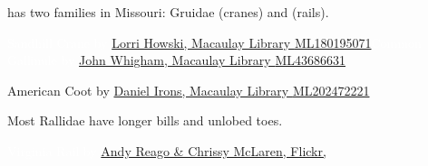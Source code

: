 \documentclass[t]{beamer}
\begin{document}
{
\begin{frame}[t]{ has two families in Missouri: Gruidae (cranes) and  (rails).}



\vfilll

\tiny \textcolor{white}{Sandhill Crane by  \href{https://macaulaylibrary.org/asset/180195071}{Lorri Howski, Macaulay Library \textsc{ML180195071}}\hfill Common Gallinule by \href{https://macaulaylibrary.org/asset/43686631}{John Whigham, Macaulay Library \textsc{ML43686631}}}


\end{frame}
}


{
\begin{frame}[b]


	\tinyfill American Coot by  \href{https://macaulaylibrary.org/asset/202472221}{Daniel Irons, Macaulay Library \textsc{ML202472221}}
\end{frame}
}


{
\begin{frame}[t]{Most Rallidae have longer bills and unlobed toes.}

	\tinyfill \textcolor{white}{Virginia Rail by  \href{https://flickr.com/photos/wildreturn/26985213537/}{Andy Reago \& Chrissy McLaren, Flickr, }}
\end{frame}
}
\end{document}
